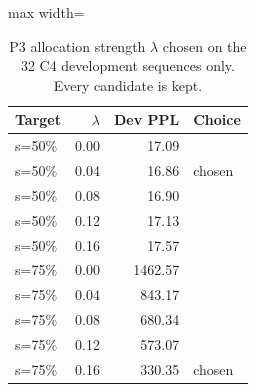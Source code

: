 \begin{table}[!htb]
\centering
\scriptsize
\setlength{\tabcolsep}{3.5pt}
\caption{P3 allocation strength $\lambda$ chosen on the 32 C4 development sequences only. Every candidate is kept.}
\label{tab:t1p3dev}
\begin{adjustbox}{max width=\linewidth}
\begin{tabular}{lrrl}
\toprule
Target & $\lambda$ & Dev PPL & Choice \\
\midrule
s=50\% & 0.00 & 17.09 &  \\
s=50\% & 0.04 & 16.86 & chosen \\
s=50\% & 0.08 & 16.90 &  \\
s=50\% & 0.12 & 17.13 &  \\
s=50\% & 0.16 & 17.57 &  \\
s=75\% & 0.00 & 1462.57 &  \\
s=75\% & 0.04 & 843.17 &  \\
s=75\% & 0.08 & 680.34 &  \\
s=75\% & 0.12 & 573.07 &  \\
s=75\% & 0.16 & 330.35 & chosen \\
\bottomrule
\end{tabular}
\end{adjustbox}
\end{table}
